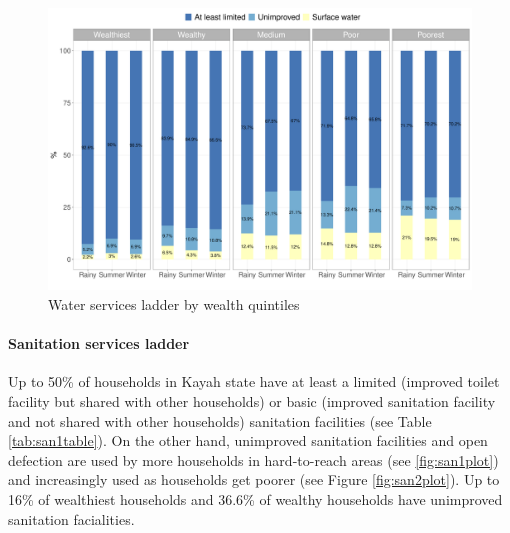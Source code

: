 \documentclass[12pt,a4paper]{article}
\let\oldparagraph\paragraph
\renewcommand{\paragraph}[1]{\oldparagraph{#1}\mbox{}}
\begin{document}
\begin{figure}[H]

{\centering \includegraphics{kayahReport_files/figure-latex/wash2plot-1} 

}

\caption{Water services ladder by wealth quintiles}\label{fig:wash2plot}
\end{figure}

\hypertarget{sanitation-services-ladder}{%
\paragraph{Sanitation services ladder}\label{sanitation-services-ladder}}

Up to 50\% of households in Kayah state have at least a limited (improved toilet facility but shared with other households) or basic (improved sanitation facility and not shared with other households) sanitation facilities (see Table \ref{tab:san1table}). On the other hand, unimproved sanitation facilities and open defection are used by more households in hard-to-reach areas (see \ref{fig:san1plot}) and increasingly used as households get poorer (see Figure \ref{fig:san2plot}). Up to 16\% of wealthiest households and 36.6\% of wealthy households have unimproved sanitation facialities.
\end{document}
